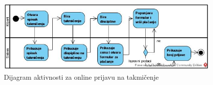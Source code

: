 \documentclass[../../main.tex]{subfiles}
\begin{document}
\begin{figure}[!ht]
\begin{center}
\includegraphics[scale=0.50]{sections/images/dijagram_aktivnosti_online_prijava_tamicenje.jpg}
\end{center}
\caption{Dijagram aktivnosti za online prijavu na takmičenje}
\label{fig:kontekst}
\end{figure}
\end{document}
